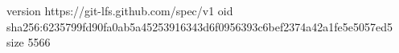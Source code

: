 version https://git-lfs.github.com/spec/v1
oid sha256:6235799fd90fa0ab5a45253916343d6f0956393c6bef2374a42a1fe5e5057ed5
size 5566
